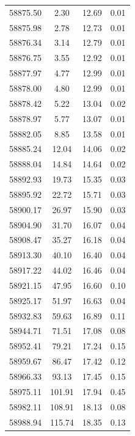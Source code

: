 \begin{longtable}{|c|c|c|c|}
 58875.50 &    2.30 &       12.69 &          0.01 \\
 58875.98 &    2.78 &       12.73 &          0.01 \\
 58876.34 &    3.14 &       12.79 &          0.01 \\
 58876.75 &    3.55 &       12.92 &          0.01 \\
 58877.97 &    4.77 &       12.99 &          0.01 \\
 58878.00 &    4.80 &       12.99 &          0.01 \\
 58878.42 &    5.22 &       13.04 &          0.02 \\
 58878.97 &    5.77 &       13.07 &          0.01 \\
 58882.05 &    8.85 &       13.58 &          0.01 \\
 58885.24 &   12.04 &       14.06 &          0.02 \\
 58888.04 &   14.84 &       14.64 &          0.02 \\
 58892.93 &   19.73 &       15.35 &          0.03 \\
 58895.92 &   22.72 &       15.71 &          0.03 \\
 58900.17 &   26.97 &       15.90 &          0.03 \\
 58904.90 &   31.70 &       16.07 &          0.04 \\
 58908.47 &   35.27 &       16.18 &          0.04 \\
 58913.30 &   40.10 &       16.40 &          0.04 \\
 58917.22 &   44.02 &       16.46 &          0.04 \\
 58921.15 &   47.95 &       16.60 &          0.10 \\
 58925.17 &   51.97 &       16.63 &          0.04 \\
 58932.83 &   59.63 &       16.89 &          0.11 \\
 58944.71 &   71.51 &       17.08 &          0.08 \\
 58952.41 &   79.21 &       17.24 &          0.15 \\
 58959.67 &   86.47 &       17.42 &          0.12 \\
 58966.33 &   93.13 &       17.45 &          0.15 \\
 58975.11 &  101.91 &       17.94 &          0.45 \\
 58982.11 &  108.91 &       18.13 &          0.08 \\
 58988.94 &  115.74 &       18.35 &          0.13 \\

\end{longtable}
